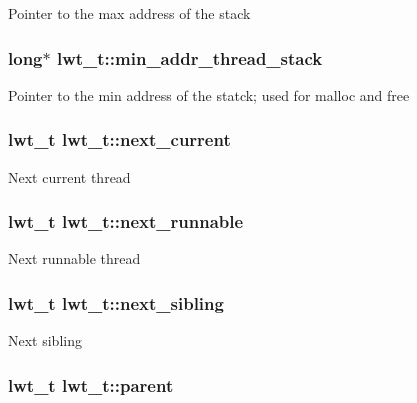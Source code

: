 Pointer to the max address of the stack \hypertarget{structlwt_a62ea9a882e0a197b9b076e1e018048d7}{
\subsubsection[{min\+\_\+addr\+\_\+thread\+\_\+stack}]{\setlength{\rightskip}{0pt plus 5cm}long$\ast$ lwt\+\_\+t\+::min\+\_\+addr\+\_\+thread\+\_\+stack}}\label{structlwt_a62ea9a882e0a197b9b076e1e018048d7}
Pointer to the min address of the statck; used for malloc and free \hypertarget{structlwt_a96a9b5218a20b704188442a3056601ae}{
\subsubsection[{next\+\_\+current}]{\setlength{\rightskip}{0pt plus 5cm}lwt\+\_\+t lwt\+\_\+t\+::next\+\_\+current}}\label{structlwt_a96a9b5218a20b704188442a3056601ae}
Next current thread \hypertarget{structlwt_a1636aae4155df6a60c90c7ab737687e4}{
\subsubsection[{next\+\_\+runnable}]{\setlength{\rightskip}{0pt plus 5cm}lwt\+\_\+t lwt\+\_\+t\+::next\+\_\+runnable}}\label{structlwt_a1636aae4155df6a60c90c7ab737687e4}
Next runnable thread \hypertarget{structlwt_a5557ab4e2bdd3634b38f5035461767d6}{
\subsubsection[{next\+\_\+sibling}]{\setlength{\rightskip}{0pt plus 5cm}lwt\+\_\+t lwt\+\_\+t\+::next\+\_\+sibling}}\label{structlwt_a5557ab4e2bdd3634b38f5035461767d6}
Next sibling \hypertarget{structlwt_a1849cde569fc8f254db05365de570b0e}{
\subsubsection[{parent}]{\setlength{\rightskip}{0pt plus 5cm}lwt\+\_\+t lwt\+\_\+t\+::parent}}\label{structlwt_a1849cde569fc8f254db05365de570b0e}
